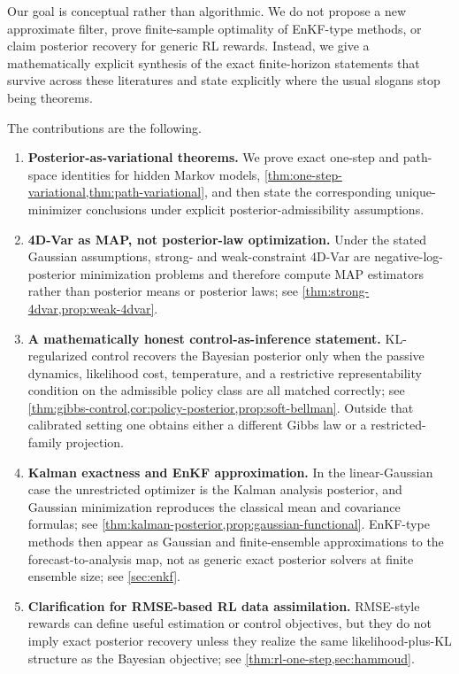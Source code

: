 \documentclass[11pt]{article}
\numberwithin{equation}{section}
\theoremstyle{plain}
\theoremstyle{definition}
\theoremstyle{remark}
\begin{document}
Our goal is conceptual rather than algorithmic. We do not propose a new approximate filter, prove finite-sample optimality of EnKF-type methods, or claim posterior recovery for generic RL rewards. Instead, we give a mathematically explicit synthesis of the exact finite-horizon statements that survive across these literatures and state explicitly where the usual slogans stop being theorems.

The contributions are the following.
\begin{enumerate}[label=\arabic*.]
\item \textbf{Posterior-as-variational theorems.} We prove exact one-step and path-space identities for hidden Markov models, \cref{thm:one-step-variational,thm:path-variational}, and then state the corresponding unique-minimizer conclusions under explicit posterior-admissibility assumptions.
\item \textbf{4D-Var as MAP, not posterior-law optimization.} Under the stated Gaussian assumptions, strong- and weak-constraint 4D-Var are negative-log-posterior minimization problems and therefore compute MAP estimators rather than posterior means or posterior laws; see \cref{thm:strong-4dvar,prop:weak-4dvar}.
\item \textbf{A mathematically honest control-as-inference statement.} KL-regularized control recovers the Bayesian posterior only when the passive dynamics, likelihood cost, temperature, and a restrictive representability condition on the admissible policy class are all matched correctly; see \cref{thm:gibbs-control,cor:policy-posterior,prop:soft-bellman}. Outside that calibrated setting one obtains either a different Gibbs law or a restricted-family projection.
\item \textbf{Kalman exactness and EnKF approximation.} In the linear-Gaussian case the unrestricted optimizer is the Kalman analysis posterior, and Gaussian minimization reproduces the classical mean and covariance formulas; see \cref{thm:kalman-posterior,prop:gaussian-functional}. EnKF-type methods then appear as Gaussian and finite-ensemble approximations to the forecast-to-analysis map, not as generic exact posterior solvers at finite ensemble size; see \cref{sec:enkf}.
\item \textbf{Clarification for RMSE-based RL data assimilation.} RMSE-style rewards can define useful estimation or control objectives, but they do not imply exact posterior recovery unless they realize the same likelihood-plus-KL structure as the Bayesian objective; see \cref{thm:rl-one-step,sec:hammoud}.
\end{enumerate}
\end{document}
